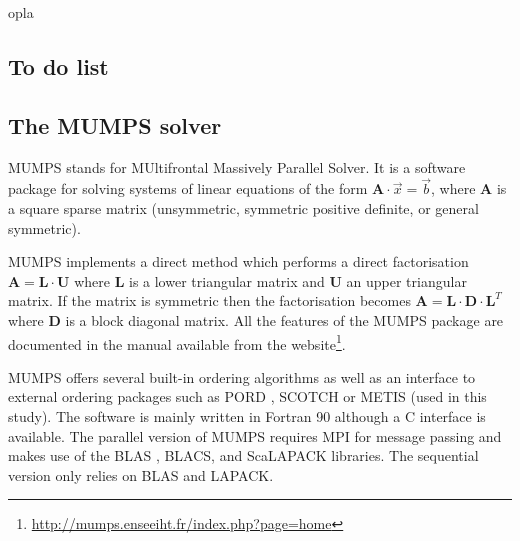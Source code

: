 opla

\begin{center}

\end{center}

\subsection{To do list}



\subsection{The MUMPS solver}

MUMPS stands for MUltifrontal Massively Parallel Solver. It is a software package 
for solving systems of linear equations of the 
form ${\bm A}\cdot{\vec x} = {\vec b}$, where ${\bm A}$ is a square sparse matrix (unsymmetric, 
symmetric positive definite, or general symmetric). 

MUMPS implements a direct method which performs a direct factorisation
${\bm A} = {\bm L}\cdot{\bm U}$ where ${\bm L}$ is a lower triangular matrix and ${\bm U}$ 
an upper triangular matrix. If the matrix is symmetric then the factorisation becomes
${\bm A} = {\bm L}\cdot{\bm D}\cdot{\bm L}^T$
where ${\bm D}$ is a block diagonal matrix. 
All the features of the MUMPS package are documented in the manual available from the 
website\footnote{\url{http://mumps.enseeiht.fr/index.php?page=home}}.


MUMPS offers several built-in ordering algorithms as well as an 
interface to external ordering packages such as PORD \cite{schu01}, SCOTCH \cite{pell07} 
or METIS \cite{kaku98} (used in this study). 
The software is mainly written in Fortran 90 although a C interface is available. 
The parallel version of MUMPS requires 
MPI \cite{snoh96} for message passing and makes use of the BLAS \cite{dodd90a,dodd90b}, BLACS, and ScaLAPACK
\cite{blcc97} libraries. 
The sequential version only relies on BLAS and LAPACK.

